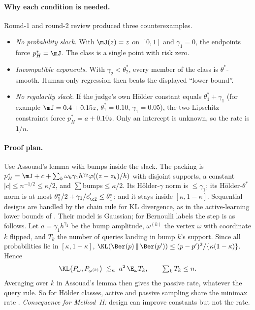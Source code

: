 \paragraph{Why each condition is needed.} Round-1 and round-2 review produced three
counterexamples.
\begin{itemize}
  \item \emph{No probability slack.} With $\mJ(z)=z$ on $[0,1]$ and $\gamma_1=0$, the endpoints force
        $p_H^{*}=\mJ$. The class is a single point with risk zero.
  \item \emph{Incompatible exponents.} With $\gamma_2<\theta_2^{*}$, every member of the class is
        $\theta^{*}$-smooth. Human-only regression then beats the displayed ``lower bound''.
  \item \emph{No regularity slack.} If the judge's own H\"older constant equals $\theta_1^{*}+\gamma_1$
        (for example $\mJ=0.4+0.15z$, $\theta_1^{*}=0.10$, $\gamma_1=0.05$), the two Lipschitz
        constraints force $p_H^{*}=a+0.10z$. Only an intercept is unknown, so the rate is $1/n$.
\end{itemize}

\paragraph{Proof plan.} Use Assouad's lemma with bumps inside the slack. The packing is
$p_H^{*}=\mJ+c+\sum_k\omega_k\gamma_1h^{\gamma_2}\varphi((z-z_k)/h)$ with disjoint supports, a
constant $|c|\le n^{-1/2}\le\kappa/2$, and $\sum$bumps$\le\kappa/2$. Its H\"older-$\gamma$ norm is
$\le\gamma_1$; its H\"older-$\theta^{*}$ norm is at most $\theta_1^{*}/2+\gamma_1/c'_{\cZ}\le\theta_1^{*}$; and
it stays inside $[\kappa,1-\kappa]$. Sequential designs are handled by the chain rule for KL divergence, as in the active-learning lower
bounds of \citet{castro2005faster}. Their model is Gaussian; for Bernoulli labels the step is as
follows. Let $a=\gamma_1h^{\gamma_2}$ be the bump amplitude, $\omega^{(k)}$ the vertex $\omega$ with
coordinate $k$ flipped, and $T_k$ the number of queries landing in bump $k$'s support. Since all
probabilities lie in $[\kappa,1-\kappa]$,
$\KL(\Ber(p)\,\|\,\Ber(p'))\le(p-p')^2/\{\kappa(1-\kappa)\}$. Hence
\[
  \KL\bigl(P_\omega,P_{\omega^{(k)}}\bigr)\;\lesssim_\kappa\;a^2\,\E_\omega T_k,
  \qquad \textstyle\sum_kT_k\le n .
\]
Averaging over $k$ in Assouad's lemma then gives the passive rate, whatever the query rule. So for
H\"older classes, active and passive sampling share the minimax rate
\citep[shown for Gaussian noise by][]{castro2005faster}. \emph{Consequence for
Method~II:} design can improve constants but not the rate.

